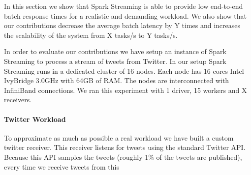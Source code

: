 \noindent

In this section we show that Spark Streaming is able to provide low end-to-end batch response times for a realistic and demanding workload. We also show that our contributions decrease the average batch latency by Y times and increases the scalability of the system from X tasks/s to Y tasks/s.

In order to evaluate our contributions we have setup an instance of Spark Streaming to process a stream of tweets from Twitter. In our setup Spark Streaming runs in a dedicated cluster of 16 nodes. Each node has 16 cores  Intel IvyBridge 3.0GHz with 64GB of RAM. The nodes are interconnected with InfiniBand connections. We ran this experiment with 1 driver, 15 workers and X receivers.

\paragraph {\bf Twitter Workload} To approximate as much as possible a real workload we have built a custom twitter receiver. This receiver listens for tweets using the standard Twitter API. Because this API samples the tweets (roughly 1\% of the tweets are published), every time we receive tweets from this 
